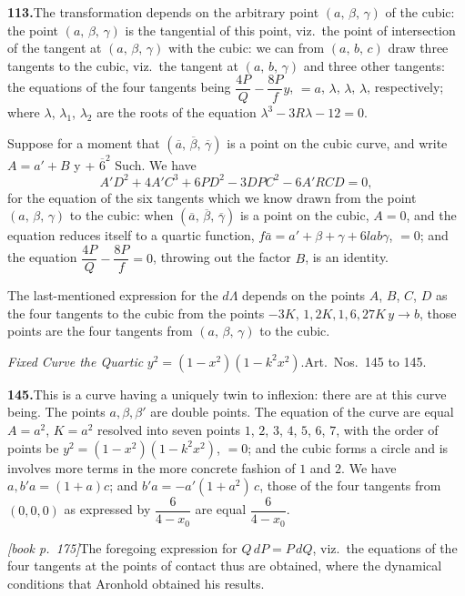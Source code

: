 \documentclass[11pt,a4paper]{article}
\begin{document}
\medskip\noindent\textbf{113.}\quad The transformation depends on the arbitrary point $(a,\,\beta,\,\gamma)$ of the cubic: the point $(a,\,\beta,\,\gamma)$ is the tangential of this point, viz.\ the point of intersection of the tangent at $(a,\,\beta,\,\gamma)$ with the cubic: we can from $(a,\,b,\,c)$ draw three tangents to the cubic, viz.\ the tangent at $(a,\,b,\,\gamma)$ and three other tangents: the equations of the four tangents being $\dfrac{4P}{Q} - \dfrac{8P}{f}y$, $= a$, $\lambda$, $\lambda$, $\lambda$, respectively; where $\lambda$, $\lambda_1$, $\lambda_2$ are the roots of the equation $\lambda^3 - 3R\lambda - 12 = 0$.

Suppose for a moment that $(\overline{a},\,\overline{\beta},\,\overline{\gamma})$ is a point on the cubic curve, and write $A = a' + B$ y + $\overline{6}^2$ Such. We have
\[
A'D^2 + 4A'C^3 + 6PD^2 - 3DPC^2 - 6A'RCD = 0,
\]
for the equation of the six tangents which we know drawn from the point $(a,\,\beta,\,\gamma)$ to the cubic: when $(\overline{a},\,\overline{\beta},\,\overline{\gamma})$ is a point on the cubic, $A = 0$, and the equation reduces itself to a quartic function, $f\bar{a} = a' + \beta + \gamma + 6lab \gamma$, $= 0$; and the equation $\dfrac{4P}{Q} - \dfrac{8P}{f} = 0$, throwing out the factor $B$, is an identity.

The last-mentioned expression for the $d\Lambda$ depends on the points $A$, $B$, $C$, $D$ as the four tangents to the cubic from the points $-3K$, $1, 2K, 1, 6, 27 K\,y \to b$, those points are the four tangents from $(a,\,\beta,\,\gamma)$ to the cubic.

\textit{Fixed Curve the Quartic} $y^2 = (1 - x^2)(1 - k^2 x^2).$\quad Art.\ Nos.\ 145 to 145.

\medskip\noindent\textbf{145.}\quad This is a curve having a uniquely twin to inflexion: there are at this curve being. The points $a, \beta, \beta'$ are double points. The equation of the curve are equal $A = a^2$, $K = a^2$ resolved into seven points $1$, $2$, $3$, $4$, $5$, $6$, $7$, with the order of points be $y^2 = (1 - x^2)(1 - k^2 x^2)$, $= 0$; and the cubic forms a circle and is involves more terms in the more concrete fashion of $1$ and $2$. We have $a, b'a = (1 + a)c$; and $b'a = -a'(1 + a^2)\,c$, those of the four tangents from $(0, 0, 0)$ as expressed by $\dfrac{6}{4-x_0}$ are equal $\dfrac{6}{4-x_0}$.

\medskip\noindent\textit{[book p.~175]}\quad The foregoing expression for $Q\,dP = P\,dQ$, viz.\ the equations of the four tangents at the points of contact thus are obtained, where the dynamical conditions that Aronhold obtained his results.
\end{document}
